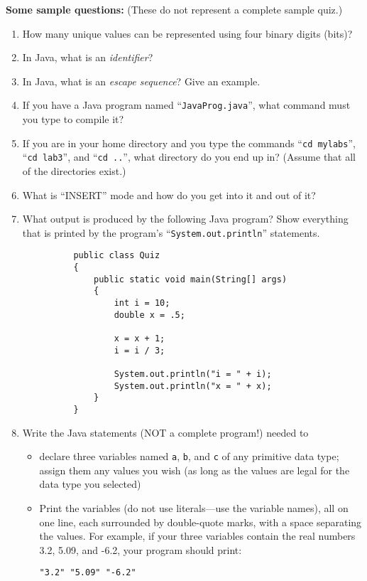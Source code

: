 \noindent \textbf{Some sample questions:} 
(These do not represent a complete sample quiz.)

\begin{enumerate}
\item How many unique values can be represented using four binary digits (bits)?

\item In Java, what is an {\em identifier}?
\item In Java, what is an {\em escape sequence}? Give an example.

\item If you have a Java program named ``{\tt JavaProg.java}'', what command must you
type to compile it?

\item
If you are in your home directory and you type the commands ``{\tt cd mylabs}'',
``{\tt cd lab3}'', and ``{\tt cd ..}'', what directory do you end up in? (Assume
that all of the directories exist.)

\item
What is ``INSERT'' mode and how do you get into it and out of it?

\item 
What output is produced by the following Java program? Show everything that
is printed by the program's ``{\tt System.out.println}'' statements.
\begin{verbatim}
          public class Quiz
          {
              public static void main(String[] args)
              {
                  int i = 10;
                  double x = .5;
          
                  x = x + 1;
                  i = i / 3;
          
                  System.out.println("i = " + i);
                  System.out.println("x = " + x);
              }
          }
\end{verbatim}

\item 
Write the Java statements (NOT a complete program!) needed to 
\begin{itemize}
\item
declare three variables named {\tt a}, {\tt b}, and 
{\tt c} of any primitive data type; assign them any values you wish (as long 
as the values are legal for the data type you selected)
\item
Print the variables (do not use literals---use the variable names), all on one
line, each surrounded by
double-quote marks, with a space separating the values. For example, 
if your three variables contain the real numbers 3.2, 5.09, and -6.2, your
program should print:
\begin{center}
\verb$"3.2" "5.09" "-6.2"$
\end{center}
\end{itemize}

\end{enumerate}

